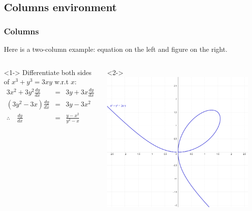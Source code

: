 \documentclass{beamer}
\begin{document}
\subsection{Columns environment}
\begin{frame}\label{frame1} %
\frametitle{Columns}
Here is a two-column example: equation on the left and figure on the right.\\
\vfill

\begin{columns} %
<1-> %
Differentiate both sides of $x^3+y^3 = 3xy$ w.r.t $x$:
\begin{eqnarray*}
3x^2+3y^2\frac{dy}{dx} &=& 3y+3x\frac{dy}{dx}\\
(3y^2-3x)\frac{dy}{dx}&=&3y-3x^2\\
\therefore \quad \frac{dy}{dx} &=& \frac{y-x^2}{y^2-x}
\end{eqnarray*}

<2-> %
\includegraphics[scale=0.2]{eqnfig}
\end{columns} %

\end{frame}

\end{document}
